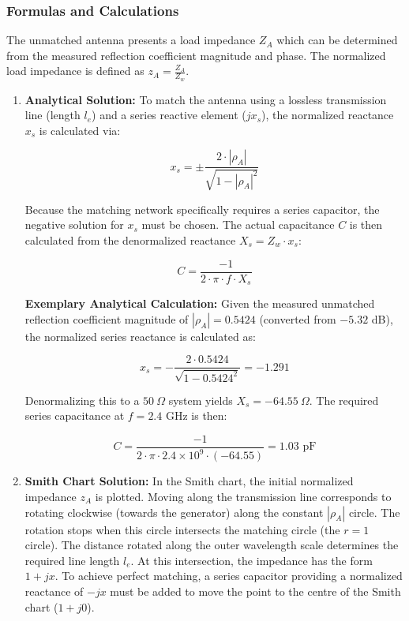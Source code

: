 \subsubsection{Formulas and Calculations}

The unmatched antenna presents a load impedance $Z_A$ which can be determined from the measured reflection coefficient magnitude and phase. The normalized load impedance is defined as $z_A = \frac{Z_A}{Z_w}$.

\begin{enumerate}
    \item[a)] \textbf{Analytical Solution:} To match the antenna using a lossless transmission line (length $l_e$) and a series reactive element ($j x_s$), the normalized reactance $x_s$ is calculated via:
    
    \begin{equation}
        x_s = \pm \frac{2 \cdot |\rho_A|}{\sqrt{1 - |\rho_A|^2}}
    \end{equation}
    
    Because the matching network specifically requires a series capacitor, the negative solution for $x_s$ must be chosen. The actual capacitance $C$ is then calculated from the denormalized reactance $X_s = Z_w \cdot x_s$:
    
    \begin{equation}
        C = \frac{-1}{2 \cdot \pi \cdot f \cdot X_s}
    \end{equation}
    
    \textbf{Exemplary Analytical Calculation:} Given the measured unmatched reflection coefficient magnitude of $|\rho_A| = 0.5424$ (converted from $-5.32$ dB), the normalized series reactance is calculated as:
    
    \begin{equation}
        x_s = -\frac{2 \cdot 0.5424}{\sqrt{1 - 0.5424^2}} = -1.291
    \end{equation}
    
    Denormalizing this to a $50\ \Omega$ system yields $X_s = -64.55\ \Omega$. The required series capacitance at $f = 2.4$ GHz is then:
    
    \begin{equation}
        C = \frac{-1}{2 \cdot \pi \cdot 2.4 \times 10^9 \cdot (-64.55)} = 1.03 \text{ pF}
    \end{equation}

    \item[b)] \textbf{Smith Chart Solution:} In the Smith chart, the initial normalized impedance $z_A$ is plotted. Moving along the transmission line corresponds to rotating clockwise (towards the generator) along the constant $|\rho_A|$ circle. The rotation stops when this circle intersects the matching circle (the $r = 1$ circle). The distance rotated along the outer wavelength scale determines the required line length $l_e$. At this intersection, the impedance has the form $1 + jx$. To achieve perfect matching, a series capacitor providing a normalized reactance of $-jx$ must be added to move the point to the centre of the Smith chart ($1 + j0$).
    

\end{enumerate}
